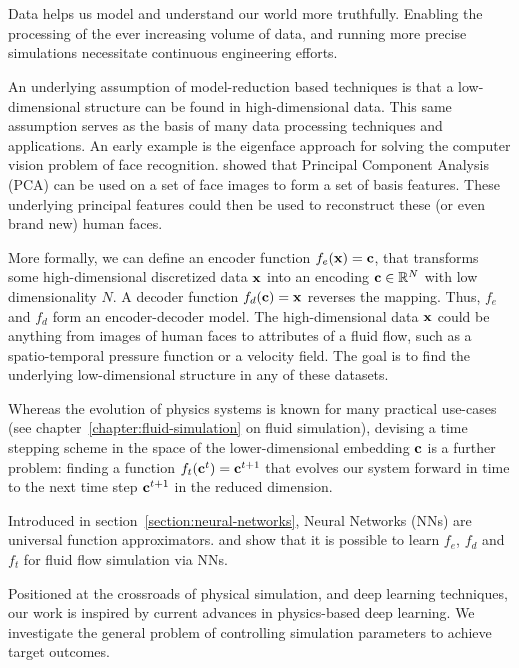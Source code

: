 \chapter{\bevezetes}

Data helps us model and understand our world more truthfully. Enabling the
processing of the ever increasing volume of data, and running more precise
simulations necessitate continuous engineering efforts.

An underlying assumption of model-reduction based techniques is that
a low-dimensional structure can be found in high-dimensional data. This same
assumption serves as the basis of many data processing techniques and
applications. An early example is the eigenface approach for solving the
computer vision problem of face recognition. \citet{eigenface1987} showed that
Principal Component Analysis (PCA) can be used on a set of face images to form
a set of basis features. These underlying principal features could then be used
to reconstruct these (or even brand new) human faces.

More formally, we can define an encoder function $f_e(\vb{x}) = \vb{c}$, that
transforms some high-dimensional discretized data $\vb{x}$ into an encoding
$\vb{c} \in \mathbb{R}^{N}$ with low dimensionality $N$. A decoder function
$f_d(\vb{c}) = \vb{x}$ reverses the mapping. Thus, $f_e$ and $f_d$ form an
encoder-decoder model. The high-dimensional data $\vb{x}$ could be anything from
images of human faces to attributes of a fluid flow, such as a spatio-temporal
pressure function or a velocity field. The goal is to find the underlying
low-dimensional structure in any of these datasets.

Whereas the evolution of physics systems is known for many practical use-cases
(see chapter~\ref{chapter:fluid-simulation} on fluid simulation), devising
a time stepping scheme in the space of the lower-dimensional embedding $\vb{c}$
is a further problem: finding a function $f_t(\vb{c}^t) = \vb{c}^{t+1}$ that
evolves our system forward in time to the next time step $\vb{c}^{t+1}$ in the
reduced dimension.

Introduced in section~\ref{section:neural-networks}, Neural Networks (NNs) are
universal function approximators.  \citet{LatentSpaceSubdivision} and
\citet{Wiewel2019LatentSP} show that it is possible to learn $f_e$, $f_d$ and
$f_t$ for fluid flow simulation via NNs.

Positioned at the crossroads of physical simulation, and deep learning
techniques, our work is inspired by current advances in physics-based deep
learning. We investigate the general problem of controlling simulation
parameters to achieve target outcomes.

